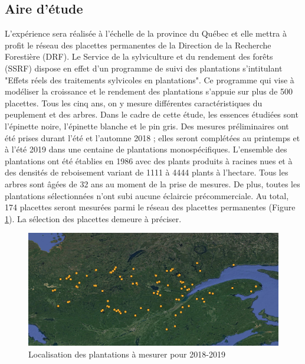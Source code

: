 \documentclass[letterpaper, 12pt]{article}
\begin{document}
\begin{onehalfspace}
\subsection{Aire d'étude}

L'expérience sera réalisée à l'échelle de la province du Québec et elle mettra à profit le réseau des placettes permanentes de la Direction de la Recherche Forestière (DRF). Le Service de la sylviculture et du rendement des forêts (SSRF) dispose en effet d'un programme de suivi des plantations s'intitulant "Effets réels des traitements sylvicoles en plantations". Ce programme qui vise à modéliser la croissance et le rendement des plantations s'appuie sur plus de 500 placettes. Tous les cinq ans, on y mesure différentes caractéristiques du peuplement et des arbres. Dans le cadre de cette étude, les essences étudiées sont l'épinette noire, l'épinette blanche et le pin gris. Des mesures préliminaires ont été prises durant l'été et l'automne 2018 ; elles seront complétées au printemps et à l'été 2019 dans une centaine de plantations monospécifiques. L'ensemble des plantations ont été établies en 1986  avec  des  plants  produits  à  racines  nues  et  à  des  densités  de  reboisement  variant  de  1111  à  4444  plants  à  l’hectare. Tous les arbres sont  âgées  de  32 ans  au  moment  de  la  prise  de  mesures. De plus, toutes les plantations sélectionnées n'ont subi aucune éclaircie précommerciale. Au total, 174 placettes seront mesurées parmi le réseau des placettes permanentes (Figure \ref{local}). La sélection des placettes demeure à préciser.  %

\vspace{12pt}

\begin{figure}[H]
	\centering
	\includegraphics[width=13cm]{Localisation}
	\caption{Localisation des plantations à mesurer pour 2018-2019}
	\label{local}
\end{figure}


\end{onehalfspace}
\end{document}
